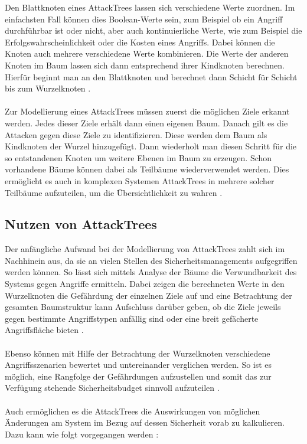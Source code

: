 Den Blattknoten eines AttackTrees lassen sich verschiedene Werte zuordnen. Im einfachsten Fall können dies Boolean-Werte sein, zum Beispiel ob ein Angriff durchführbar ist oder nicht, aber auch kontinuierliche Werte, wie zum Beispiel die Erfolgswahrscheinlichkeit oder die Kosten eines Angriffs. Dabei können die Knoten auch mehrere verschiedene Werte kombinieren. Die Werte der anderen Knoten im Baum lassen sich dann entsprechend ihrer Kindknoten berechnen. Hierfür beginnt man an den Blattknoten und berechnet dann Schicht für Schicht bis zum Wurzelknoten \cite{schneier1999attacktree}.
\\
\\
Zur Modellierung eines AttackTrees müssen zuerst die möglichen Ziele erkannt werden. Jedes dieser Ziele erhält dann einen eigenen Baum. Danach gilt es die Attacken gegen diese Ziele zu identifizieren. Diese werden dem Baum als Kindknoten der Wurzel hinzugefügt. Dann wiederholt man diesen Schritt für die so entstandenen Knoten um weitere Ebenen im Baum zu erzeugen. Schon vorhandene Bäume können dabei als Teilbäume wiederverwendet werden. Dies ermöglicht es auch in komplexen Systemen AttackTrees in mehrere solcher Teilbäume aufzuteilen, um die Übersichtlichkeit zu wahren \cite{schneier1999attacktree}.

\subsection{Nutzen von AttackTrees}
Der anfängliche Aufwand bei der Modellierung von AttackTrees zahlt sich im Nachhinein aus, da sie an vielen Stellen des Sicherheitsmanagements aufgegriffen werden können. So lässt sich mittels Analyse der Bäume die Verwundbarkeit des Systems gegen Angriffe ermitteln. Dabei zeigen die berechneten Werte in den Wurzelknoten die Gefährdung der einzelnen Ziele auf und eine Betrachtung der gesamten Baumstruktur kann Aufschluss darüber geben, ob die Ziele jeweils gegen bestimmte Angriffstypen anfällig sind oder eine breit gefächerte Angriffsfläche bieten \cite{schneier1999attacktree}.
\\
\\
Ebenso können mit Hilfe der Betrachtung der Wurzelknoten verschiedene Angriffsszenarien bewertet und untereinander verglichen werden. So ist es möglich, eine Rangfolge der Gefährdungen aufzustellen und somit das zur Verfügung stehende Sicherheitsbudget sinnvoll aufzuteilen \cite{schneier1999attacktree}.
\\
\\
Auch ermöglichen es die AttackTrees die Auswirkungen von möglichen Änderungen am System im Bezug auf dessen Sicherheit vorab zu kalkulieren.  Dazu kann wie folgt vorgegangen werden \cite{schneier1999attacktree}:


